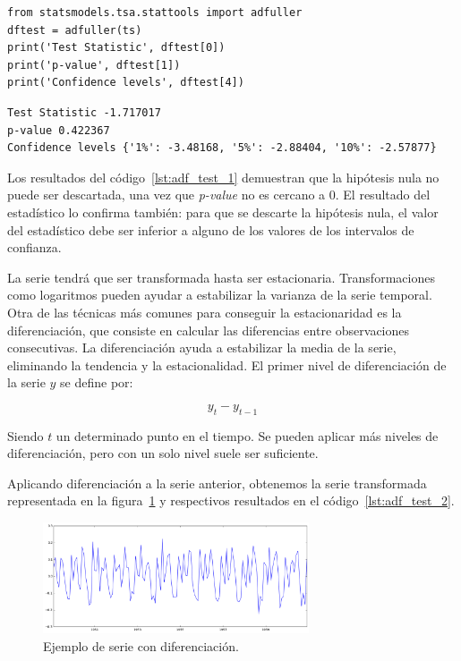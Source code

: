 \documentclass[11pt,spanish,listoffigures,listoftables]{tfgetsinf}
\begin{document}
    \lstset{style=python}
    \begin{lstlisting}[caption=Test de Dickey-Fuller de {\tt statsmodels} de Python., label={lst:adf_test_1}]
from statsmodels.tsa.stattools import adfuller
dftest = adfuller(ts)
print('Test Statistic', dftest[0])
print('p-value', dftest[1])
print('Confidence levels', dftest[4])  
    \end{lstlisting}
    
    \lstset{style=python}
    \begin{lstlisting}[caption=Resultados del test de Dickey-Fuller de {\tt statsmodels} de Python., label={lst:adf_res_1}]
Test Statistic -1.717017
p-value 0.422367
Confidence levels {'1%': -3.48168, '5%': -2.88404, '10%': -2.57877}
    \end{lstlisting}
    
    Los resultados del código~\ref{lst:adf_test_1} demuestran que la hipótesis nula no puede ser descartada, una vez que {\em p-value} no es cercano a 0. El resultado del estadístico lo confirma también: para que se descarte la hipótesis nula, el valor del estadístico debe ser inferior a alguno de los valores de los intervalos de confianza.
    
    La serie tendrá que ser transformada hasta ser estacionaria. Transformaciones como logaritmos pueden ayudar a estabilizar la varianza de la serie temporal. Otra de las técnicas más comunes para conseguir la estacionaridad es la diferenciación, que consiste en calcular las diferencias entre observaciones consecutivas. La diferenciación ayuda a estabilizar la media de la serie, eliminando la tendencia y la estacionalidad. El primer nivel de diferenciación de la serie \(y\) se define por:
    
    \begin{equation}
    y_{t}-y_{t-1}
    \end{equation}
    
    Siendo \(t\) un determinado punto en el tiempo. Se pueden aplicar más niveles de diferenciación, pero con un solo nivel suele ser suficiente.
    
    Aplicando diferenciación a la serie anterior, obtenemos la serie transformada representada en la figura~\ref{fig:timeseries_log_diff} y respectivos resultados en el código~\ref{lst:adf_test_2}.
    
    \begin{figure}[h]
        \centering
        \includegraphics[width=0.7\textwidth]{timeseries_log_diff.png}
        \caption{Ejemplo de serie con diferenciación.}
        \label{fig:timeseries_log_diff}
    \end{figure}
    
\end{document}
